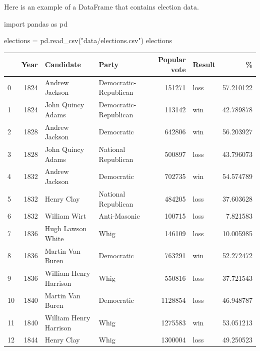 \documentclass[
  letterpaper,
  DIV=11,
  numbers=noendperiod]{scrreprt}
\newenvironment{Shaded}{\begin{snugshade}}{\end{snugshade}}
\newcommand{\ImportTok}[1]{\textcolor[rgb]{0.00,0.46,0.62}{#1}}
\newcommand{\NormalTok}[1]{\textcolor[rgb]{0.00,0.23,0.31}{#1}}
\newcommand{\OperatorTok}[1]{\textcolor[rgb]{0.37,0.37,0.37}{#1}}
\newcommand{\StringTok}[1]{\textcolor[rgb]{0.13,0.47,0.30}{#1}}
\begin{document}
Here is an example of a DataFrame that contains election data.

\begin{Shaded}
\begin{Highlighting}[]
\ImportTok{import}\NormalTok{ pandas }\ImportTok{as}\NormalTok{ pd}

\NormalTok{elections }\OperatorTok{=}\NormalTok{ pd.read\_csv(}\StringTok{"data/elections.csv"}\NormalTok{)}
\NormalTok{elections}
\end{Highlighting}
\end{Shaded}

\begin{tabular}{lrllrlr}
\toprule
{} &  Year &               Candidate &                  Party &  Popular vote & Result &          \% \\
\midrule
0   &  1824 &          Andrew Jackson &  Democratic-Republican &        151271 &   loss &  57.210122 \\
1   &  1824 &       John Quincy Adams &  Democratic-Republican &        113142 &    win &  42.789878 \\
2   &  1828 &          Andrew Jackson &             Democratic &        642806 &    win &  56.203927 \\
3   &  1828 &       John Quincy Adams &    National Republican &        500897 &   loss &  43.796073 \\
4   &  1832 &          Andrew Jackson &             Democratic &        702735 &    win &  54.574789 \\
5   &  1832 &              Henry Clay &    National Republican &        484205 &   loss &  37.603628 \\
6   &  1832 &            William Wirt &           Anti-Masonic &        100715 &   loss &   7.821583 \\
7   &  1836 &       Hugh Lawson White &                   Whig &        146109 &   loss &  10.005985 \\
8   &  1836 &        Martin Van Buren &             Democratic &        763291 &    win &  52.272472 \\
9   &  1836 &  William Henry Harrison &                   Whig &        550816 &   loss &  37.721543 \\
10  &  1840 &        Martin Van Buren &             Democratic &       1128854 &   loss &  46.948787 \\
11  &  1840 &  William Henry Harrison &                   Whig &       1275583 &    win &  53.051213 \\
12  &  1844 &              Henry Clay &                   Whig &       1300004 &   loss &  49.250523 \\

\end{tabular}
\end{document}

